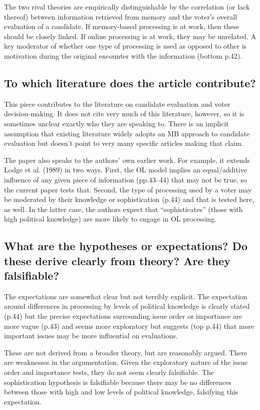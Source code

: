 \documentclass[a4paper]{exam}
\begin{document}
The two rival theories are empirically distinguishable by the correlation (or lack thereof) between information retrieved from memory and the voter's overall evaluation of a candidate. If memory-based processing is at work, then these should be closely linked. If online processing is at work, they may be unrelated. A key moderator of whether one type of processing is used as opposed to other is motivation during the original encounter with the information (bottom p.42).

\subsection{To which literature does the article contribute?}

This piece contributes to the literature on candidate evaluation and voter decision-making. It does not cite very much of this literature, however, so it is sometimes unclear exactly who they are speaking to. There is an implicit assumption that existing literature widely adopts an MB approach to candidate evaluation but doesn't point to very many specific articles making that claim.

The paper also speaks to the authors' own earlier work. For example, it extends Lodge et al. (1989) in two ways. First, the OL model implies an equal/additive influence of any given piece of information (pp.43--44) that may not be true, so the current paper tests that. Second, the type of processing used by a voter may be moderated by their knowledge or sophistication (p.44) and that is tested here, as well. In the latter case, the authors expect that ``sophisticates'' (those with high political knowledge) are more likely to engage in OL processing.

\subsection{What are the hypotheses or expectations? Do these derive clearly from theory? Are they falsifiable?}

The expectations are somewhat clear but not terribly explicit. The expectation around differences in processing by levels of political knowledge is clearly stated (p.44) but the precise expectations surrounding issue order or importance are more vague (p.43) and seems more exploratory but suggests (top p.44) that more important issues may be more influential on evaluations.

These are not derived from a broader theory, but are reasonably argued. There are weaknesses in the argumentation. Given the exploratory nature of the issue order and importance tests, they do not seem clearly falsifiable. The sophistication hypothesis is falsifiable because there may be no differences between those with high and low levels of political knowledge, falsifying this expectation.
\end{document}
